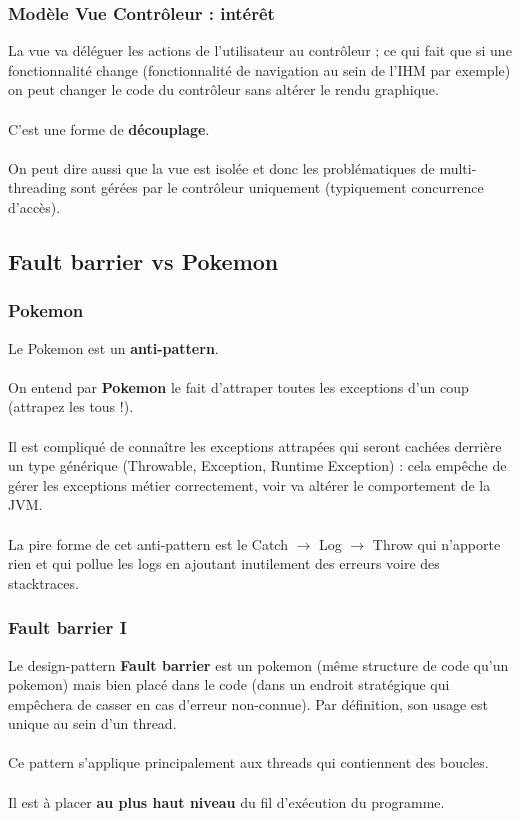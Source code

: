 \begin{frame}[fragile]
	\frametitle{Mod\`{e}le Vue Contr\^{o}leur : int\'{e}r\^{e}t}

	La vue va d\'{e}l\'{e}guer les actions de l'utilisateur au contr\^{o}leur ; ce qui fait que si une fonctionnalit\'{e} change (fonctionnalit\'{e} de navigation au sein de l'IHM par exemple) on peut changer le code du contr\^{o}leur sans alt\'{e}rer le rendu graphique.
	\\~\\
	C'est une forme de \textbf{d\'{e}couplage}.
	\\~\\
	On peut dire aussi que la vue est isol\'{e}e et donc les probl\'{e}matiques de multi-threading sont g\'{e}r\'{e}es par le contr\^{o}leur uniquement (typiquement concurrence d'acc\`{e}s).
\end{frame}

\subsection{Fault barrier vs Pokemon}

\begin{frame}[fragile]
	\frametitle{Pokemon}

	Le Pokemon est un \textbf{anti-pattern}.
	\\~\\
    On entend par \textbf{Pokemon} le fait d'attraper toutes les exceptions d'un coup (attrapez les tous !).
    \\~\\
    Il est compliqu\'{e} de conna\^{i}tre les exceptions attrap\'{e}es qui seront cach\'{e}es derri\`{e}re un type g\'{e}n\'{e}rique (Throwable, Exception, Runtime Exception) : cela emp\^{e}che de g\'{e}rer les exceptions m\'{e}tier correctement, voir va alt\'{e}rer le comportement de la JVM.
    \\~\\
    La pire forme de cet anti-pattern est le Catch $\longrightarrow$ Log $\longrightarrow$ Throw qui n'apporte rien et qui pollue les logs en ajoutant inutilement des erreurs voire des stacktraces.
\end{frame}

\begin{frame}[fragile]
	\frametitle{Fault barrier I}
Le design-pattern \textbf{Fault barrier} est un pokemon (m\^{e}me structure de code qu'un pokemon) mais bien plac\'{e} dans le code (dans un endroit strat\'{e}gique qui emp\^{e}chera de casser en cas d'erreur non-connue). Par d\'{e}finition, son usage est unique au sein d'un thread.
\\~\\
Ce pattern s'applique principalement aux threads qui contiennent des boucles.
\\~\\
Il est \`{a} placer \textbf{au plus haut niveau} du fil d'ex\'{e}cution du programme.
\end{frame}

